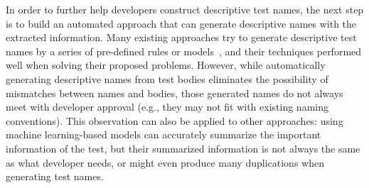 In order to further help developers construct descriptive test names, the next step is to build an automated approach that can generate descriptive names with the extracted information.
%
Many existing approaches try to generate descriptive test names by a series of pre-defined rules or models~\cite{arcuri2014automated, zhang2015automatically, allamanis2015suggesting, daka2017generating, li2019deepfl}, and their techniques performed well when solving their proposed problems.
However, while automatically generating descriptive names from test bodies eliminates the possibility of mismatches between names and bodies, those generated names do not always meet with developer approval (e.g., they may not fit with existing naming conventions).
%
This observation can also be applied to other approaches: using machine learning-based models can accurately summarize the important information of the test, but their summarized information is not always the same as what developer needs, or might even produce many duplications when generating test names.


